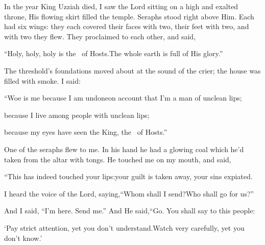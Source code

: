 
\begin{inparaenum}
   In the year King Uzziah died, I saw the Lord sitting on a high and exalted throne, His flowing skirt filled the temple.%
   Seraphs stood right above Him. Each had six wings: they each covered their faces with two, their feet with two, and with two they flew.%
   They proclaimed to each other, and said,\smallskip%
  
  \pc ``Holy, holy, holy is the \lord\ of Hosts.\pa The whole earth is full of His glory.''\smallskip%
  
  \noindent{} The threshold's foundations moved about at the sound of the crier; the house was filled with smoke.%
   I said:\smallskip%
  
  \pc ``Woe is me because I am undone\pa on account that I'm a man of unclean lips;%
  
  \pc because I live among people with unclean lips;%
  
  \pc because my eyes have seen the King, the \lord\ of Hosts.''\smallskip%
  
  \noindent{} One of the seraphs flew to me. In his hand he had a glowing coal which he'd taken from the altar with tongs.%
   He touched me on my mouth,%
  and said,\smallskip%
  
  \pc ``This has indeed touched your lips:\pa your guilt is taken away, your sins expiated.%
  
  \pa {} I heard the voice of the Lord, saying,\pa ``Whom shall I send?\pa Who shall go for us?''%
  
  \pa And I said, ``I'm here.%
  Send me.''\pa {} And He said,\pa ``Go. You shall say to this people:%
  
  \pc `Pay strict attention, yet you don't understand.\pa Watch very carefully, yet you don't know.'%
  

\end{inparaenum}
